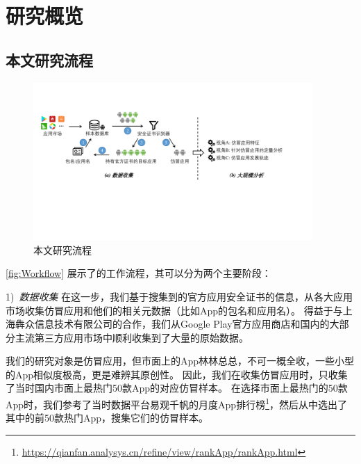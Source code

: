 \chapter{研究概览}
\label{chp:dataCollection}

\section{本文研究流程}

\begin{figure}[htbp]
	\centering
	\includegraphics[width=0.95\textwidth]{./Figures/overview_modified.pdf}
	\caption{本文研究流程}
	\label{fig:Workflow}
	\vspace{-3mm}
\end{figure}

\autoref{fig:Workflow} 展示了的工作流程，其可以分为两个主要阶段：

1)\ \emph{数据收集} \quad
在这一步，我们基于搜集到的官方应用安全证书的信息，从各大应用市场收集仿冒应用和他们的相关元数据（比如App的包名和应用名）。
得益于与上海犇众信息技术有限公司的合作，我们从Google Play官方应用商店和国内的大部分主流第三方应用市场中顺利收集到了大量的原始数据。

我们的研究对象是仿冒应用，但市面上的App林林总总，不可一概全收，一些小型的App相似度极高，更是难辨其原创性。
因此，我们在收集仿冒应用时，只收集了当时国内市面上最热门50款App的对应仿冒样本。
在选择市面上最热门的50款App时，我们参考了当时数据平台易观千帆的月度App排行榜\footnote{\url{https://qianfan.analysys.cn/refine/view/rankApp/rankApp.html}}，然后从中选出了其中的前50款热门App，搜集它们的仿冒样本。

